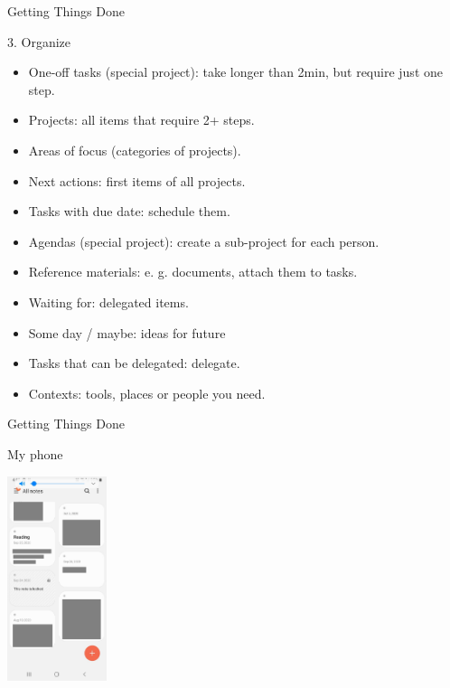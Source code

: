 \begin{frame}{Getting Things Done}
  \begin{block}{3. Organize}
    \begin{itemize}
      \item One-off tasks (special project): take longer than 2min, but require just one step.
      \item Projects: all items that require 2+ steps.
      \item Areas of focus (categories of projects).
      \item Next actions: first items of all projects.
      \item Tasks with due date: schedule them.
      \item Agendas (special project): create a sub-project for each person.
      \item Reference materials: e. g. documents, attach them to tasks.
      \item Waiting for: delegated items.
      \item Some day / maybe: ideas for future
      \item Tasks that can be delegated: delegate.
      \item Contexts: tools, places or people you need. %
    \end{itemize}
  \end{block}
\end{frame}

\begin{frame}{Getting Things Done}
  \begin{block}{My phone}
    \begin{center}
      \includegraphics[height=6cm]{img/phone-notes.jpg}
    \end{center}
  \end{block}
\end{frame}

